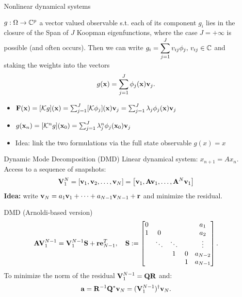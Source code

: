 \documentclass{beamer}
\begin{document}
\begin{frame}[fragile]{Nonlinear dynamical systems}
\begin{definition}
$g:\Omega\to\mathbb{C}^p$ a vector valued observable s.t. each of its component $g_i$ lies in the closure of the Span of $J$ Koopman eigenfunctions, where the case $J=+\infty$ is possible (and often occurs). Then we can write $\displaystyle{g_i = \sum_{j = 1}^J v_{ij}\phi_j, \, v_{ij}\in\mathbb{C}}$ and staking the weights into the vectors 
\begin{equation}
    \label{koopman_modes}
	g(\vb{x}) = \sum_{j = 1}^J \phi_j(\vb{x})\vb{v}_{j}.
\end{equation}
\end{definition}
\begin{itemize}
    \item $\vb{F}(\vb{x}) = [\mathcal{K}g](\vb{x}) = \sum_{j = 1}^J [\mathcal{K}\phi_j](\vb{x})\vb{v}_j = \sum_{j = 1}^J \lambda_j\phi_j(\vb{x})\vb{v}_j$
    \item $g(\vb{x}_n) = [\mathcal{K}^ng](\vb{x}_0) = \sum_{j = 1}^J \lambda_j^n\phi_j(\vb{x}_0)\vb{v}_{j}$ 
    \item Idea: link the two formulations via the full state observable $g(x) = x$
\end{itemize}
\end{frame}

\begin{frame}[fragile]{Dynamic Mode Decomposition (DMD)}
Linear dynamical system: $x_{n+1} = Ax_n$. Access to a sequence of snapshots:
\begin{equation*}
    \vb{V}_1^N = \left[\vb{v}_1, \vb{v}_2, \dots, \vb{v}_N\right] = \left[\vb{v}_1, \vb{A}\vb{v}_1, \dots, \vb{A}^N\vb{v}_1\right]
\end{equation*}
\alert{\textbf{Idea:}} write $\vb{v}_N = a_1 \vb{v}_1 + \dots + a_{N-1} \vb{v}_{N-1} + \vb{r}$ and minimize the residual.
\begin{block}{DMD (Arnoldi-based version)}
\begin{equation*}
    \vb{A}\vb{V}_1^{N-1}  = \vb{V}_1^{N-1}\vb{S} + \vb{r}\vb{e}_{N-1}^T, \quad 
    \vb{S} :=
   \begin{bmatrix}
   0     &        &       &      & a_1 \\
   1     & 0      &       &      & a_2 \\
         & \ddots & \ddots&      & \vdots \\ 
         &        & 1     & 0    & a_{N-2} \\
         &        &       & 1    & a_{N-1} \\
   \end{bmatrix}.
\end{equation*}
To minimize the norm of the residual $\vb{V}_1^{N-1} = \vb{Q}\vb{R}$ and:
\begin{equation*}
    \vb{a} = \vb{R}^{-1} \vb{Q}^*\vb{v}_N = (\vb{V}_1^{N-1})^{\dagger}\vb{v}_N.
\end{equation*}
\end{block}
\end{frame}
\end{document}
